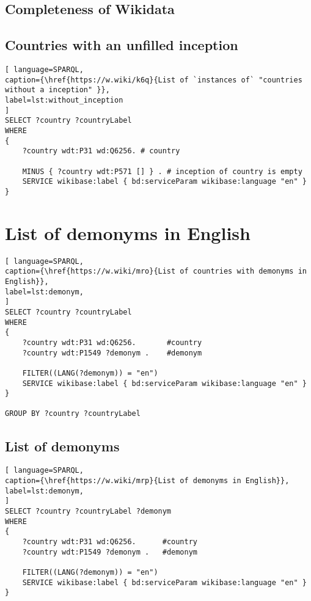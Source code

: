 \subsection{Completeness of Wikidata}

\subsection{Countries with an unfilled inception}

\begin{lstlisting}[ language=SPARQL, 
caption={\href{https://w.wiki/k6q}{List of `instances of` "countries without a inception" }},
label=lst:without_inception
]
SELECT ?country ?countryLabel 
WHERE
{
	?country wdt:P31 wd:Q6256. # country
	
	MINUS { ?country wdt:P571 [] } . # inception of country is empty
	SERVICE wikibase:label { bd:serviceParam wikibase:language "en" }
}
\end{lstlisting}

\section{List of demonyms in English}

\begin{lstlisting}[ language=SPARQL, 
caption={\href{https://w.wiki/mro}{List of countries with demonyms in English}},
label=lst:demonym, 
]
SELECT ?country ?countryLabel 
WHERE
{
	?country wdt:P31 wd:Q6256.       #country
	?country wdt:P1549 ?demonym .    #demonym
	
	FILTER((LANG(?demonym)) = "en")
	SERVICE wikibase:label { bd:serviceParam wikibase:language "en" }
}

GROUP BY ?country ?countryLabel
\end{lstlisting}

\subsection{List of demonyms}

\begin{lstlisting}[ language=SPARQL, 
caption={\href{https://w.wiki/mrp}{List of demonyms in English}},
label=lst:demonym, 
]
SELECT ?country ?countryLabel ?demonym
WHERE
{
	?country wdt:P31 wd:Q6256.      #country
	?country wdt:P1549 ?demonym .   #demonym
	
	FILTER((LANG(?demonym)) = "en")
	SERVICE wikibase:label { bd:serviceParam wikibase:language "en" }
}
\end{lstlisting}

